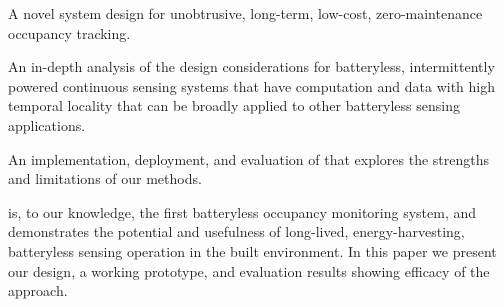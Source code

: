 \begin{compactenum}
	\item A novel system design for unobtrusive, long-term, low-cost, zero-maintenance occupancy tracking.
	\item An in-depth analysis of the design considerations for batteryless, intermittently powered continuous sensing systems that have computation and data with high temporal locality that can be broadly applied to other batteryless sensing applications.
	\item An implementation, deployment, and evaluation of \sysname that explores the strengths and limitations of our methods.
\end{compactenum}

\noind
\sysname is, to our knowledge, the first batteryless occupancy monitoring system, and demonstrates the potential and usefulness of long-lived, energy-harvesting, batteryless sensing operation in the built environment.
In this paper we present our design, a working prototype, and evaluation results showing efficacy of the approach.



